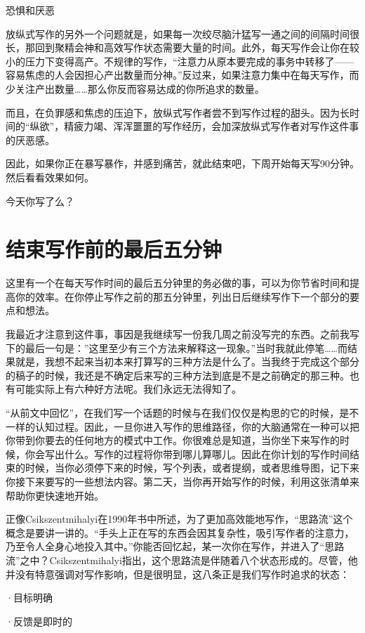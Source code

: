 \documentclass{ctexart}
\begin{document}
恐惧和厌恶

放纵式写作的另外一个问题就是，如果每一次绞尽脑汁猛写一通之间的间隔时间很长，那回到聚精会神和高效写作状态需要大量的时间。此外，每天写作会让你在较小的压力下变得高产。不规律的写作，“注意力从原本要完成的事务中转移了——容易焦虑的人会因担心产出数量而分神。”反过来，如果注意力集中在每天写作，而少关注产出数量……那么你反而容易达成的你所追求的数量。

而且，在负罪感和焦虑的压迫下，放纵式写作者尝不到写作过程的甜头。因为长时间的“纵欲”，精疲力竭、浑浑噩噩的写作经历，会加深放纵式写作者对写作这件事的厌恶感。

因此，如果你正在暴写暴作，并感到痛苦，就此结束吧，下周开始每天写90分钟。然后看看效果如何。

今天你写了么？

\section{结束写作前的最后五分钟}

这里有一个在每天写作时间的最后五分钟里的务必做的事，可以为你节省时间和提高你的效率。在你停止写作之前的那五分钟里，列出日后继续写作下一个部分的要点和想法。

我最近才注意到这件事，事因是我继续写一份我几周之前没写完的东西。之前我写下的最后一句是：”这里至少有三个方法来解释这一现象。”当时我就此停笔……而结果就是，我想不起来当初本来打算写的三种方法是什么了。当我终于完成这个部分的稿子的时候，我还是不确定后来写的三种方法到底是不是之前确定的那三种。也有可能实际上有六种好方法呢。我们永远无法得知了。

“从前文中回忆”，在我们写一个话题的时候与在我们仅仅是构思的它的时候，是不一样的认知过程。因此，一旦你进入写作的思维路径，你的大脑通常在一种可以把你带到你要去的任何地方的模式中工作。你很难总是知道，当你坐下来写作的时候，你会写出什么。写作的过程将你带到哪儿算哪儿。因此在你计划的写作时间结束的时候，当你必须停下来的时候，写个列表，或者提纲，或者思维导图，记下来你接下来要写的一些想法内容。第二天，当你再开始写作的时候，利用这张清单来帮助你更快速地开始。

正像Csikszentmihalyi在1990年书中所述，为了更加高效能地写作，“思路流”这个概念是要讲一讲的。“手头上正在写的东西会因其复杂性，吸引写作者的注意力，乃至令人全身心地投入其中。”你能否回忆起，某一次你在写作，并进入了“思路流”之中？Csikszentmihalyi指出，这个思路流是伴随着八个状态形成的。尽管，他并没有特意强调对写作影响，但是很明显，这八条正是我们写作时追求的状态：

·目标明确

·反馈是即时的
\end{document}
